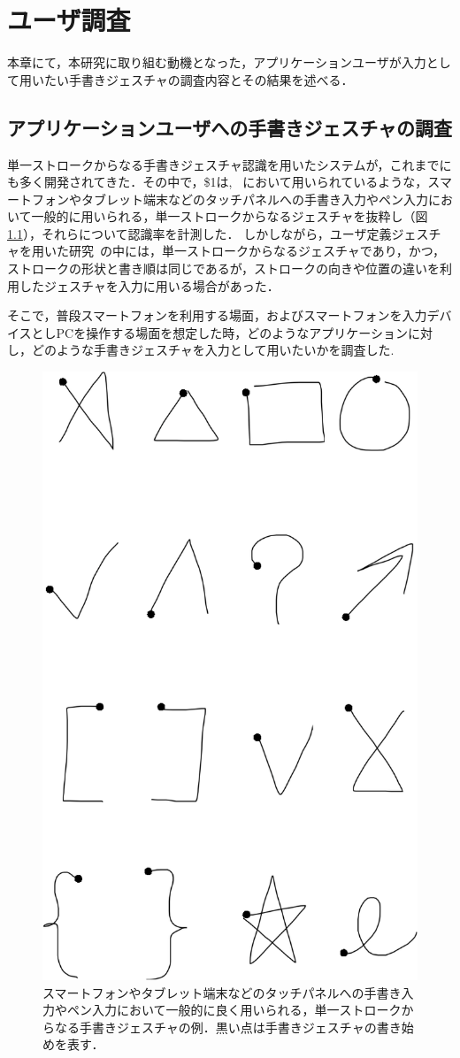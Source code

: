 \chapter{ユーザ調査}
本章にて，本研究に取り組む動機となった，アプリケーションユーザが入力として用いたい手書きジェスチャの調査内容とその結果を述べる．

\section{アプリケーションユーザへの手書きジェスチャの調査}
単一ストロークからなる手書きジェスチャ認識を用いたシステムが，これまでにも多く開発されてきた．その中で，\$1は,  ~\cite{Hong:2000:STI:354401.354412, Landay:1993:EEU:259964.260123, Lin:2000:DFT:332040.332486}において用いられているような，スマートフォンやタブレット端末などのタッチパネルへの手書き入力やペン入力において一般的に用いられる，単一ストロークからなるジェスチャを抜粋し（図\ref{fig:stroke_1}），それらについて認識率を計測した．
しかしながら，ユーザ定義ジェスチャを用いた研究~\cite{Vatavu:2012:UGF:2325616.2325626, Bragdon:2011:EAT:1978942.1979000, Wobbrock:2009:UGS:1518701.1518866, Shimon:2015:EUB:2785830.2785890}の中には，単一ストロークからなるジェスチャであり，かつ，ストロークの形状と書き順は同じであるが，ストロークの向きや位置の違いを利用したジェスチャを入力に用いる場合があった．

そこで，普段スマートフォンを利用する場面，およびスマートフォンを入力デバイスとしPCを操作する場面を想定した時，どのようなアプリケーションに対し，どのような手書きジェスチャを入力として用いたいかを調査した.

\begin{figure}[!h]
\centering
\includegraphics[width=0.4\columnwidth]{img/stroke_1.eps}
\caption{スマートフォンやタブレット端末などのタッチパネルへの手書き入力やペン入力において一般的に良く用いられる，単一ストロークからなる手書きジェスチャの例．黒い点は手書きジェスチャの書き始めを表す．}
\label{fig:stroke_1}
\end{figure}

